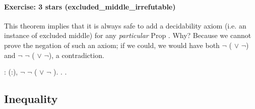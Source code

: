 \documentclass[12pt]{report}
\begin{document}
\paragraph{Exercise: 3 stars (excluded\_middle\_irrefutable)}

 This theorem implies that it is always safe to add a decidability
axiom (i.e. an instance of excluded middle) for any \textit{particular} Prop .
Why? Because we cannot prove the negation of such an axiom; if we could,
we would have both \ensuremath{\lnot} ( \ensuremath{\lor} \ensuremath{\lnot}) and \ensuremath{\lnot} \ensuremath{\lnot} ( \ensuremath{\lor} \ensuremath{\lnot}), a contradiction. \begin{coqdoccode}
\coqdocemptyline
\coqdocnoindent
{} :  \coqdockw{\ensuremath{\forall}} (:), \ensuremath{\lnot} \ensuremath{\lnot} ( \ensuremath{\lor} \ensuremath{\lnot} ).\coqdoceol
\coqdocnoindent
{}.\coqdoceol
 .\coqdoceol
\coqdocemptyline
\end{coqdoccode}
\subsection{Inequality}
\end{document}
